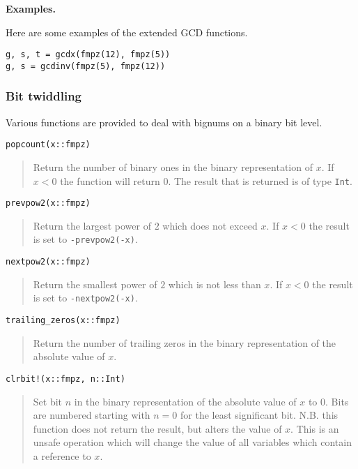 \documentclass[a4paper,10pt]{article}
\newcommand{\code}{\lstinline}
\newcommand{\desc}[1]{\vspace{-3mm}\begin{quote}#1\end{quote}}
\begin{document}
{{\textbf{Examples.}

Here are some examples of the extended GCD functions.

\begin{lstlisting}
g, s, t = gcdx(fmpz(12), fmpz(5))
g, s = gcdinv(fmpz(5), fmpz(12))
\end{lstlisting}

\subsubsection{Bit twiddling}

Various functions are provided to deal with bignums on a binary bit level.

\begin{lstlisting}
popcount(x::fmpz)
\end{lstlisting}

\desc{Return the number of binary ones in the binary representation of $x$. If $x < 0$ the
function will return $0$. The result that is returned is of type \code{Int}.}

\begin{lstlisting}
prevpow2(x::fmpz)
\end{lstlisting}

\desc{Return the largest power of $2$ which does not exceed $x$. If $x < 0$ the result is
set to \code{-prevpow2(-x)}.}

\begin{lstlisting}
nextpow2(x::fmpz)
\end{lstlisting}

\desc{Return the smallest power of $2$ which is not less than $x$. If $x < 0$ the result is
set to \code{-nextpow2(-x)}.}

\begin{lstlisting}
trailing_zeros(x::fmpz)
\end{lstlisting}

\desc{Return the number of trailing zeros in the binary representation of the absolute
value of $x$.}

\begin{lstlisting}
clrbit!(x::fmpz, n::Int)
\end{lstlisting}

\desc{Set bit $n$ in the binary representation of the absolute value of $x$ to $0$. Bits
are numbered starting with $n = 0$ for the least significant bit. N.B. this function does
not return the result, but alters the value of $x$. This is an unsafe operation which will
change the value of all variables which contain a reference to $x$.}

}}
\end{document}
